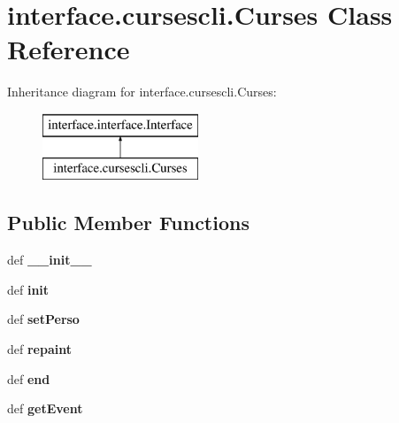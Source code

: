 \hypertarget{classinterface_1_1cursescli_1_1_curses}{\section{interface.\-cursescli.\-Curses \-Class \-Reference}
\label{classinterface_1_1cursescli_1_1_curses}
}
\-Inheritance diagram for interface.\-cursescli.\-Curses\-:\begin{figure}[H]
\begin{center}
\leavevmode
\includegraphics[height=2.000000cm]{classinterface_1_1cursescli_1_1_curses}
\end{center}
\end{figure}
\subsection*{\-Public \-Member \-Functions}
\begin{DoxyCompactItemize}
\item 
\hypertarget{classinterface_1_1cursescli_1_1_curses_a192eb6300c83226e1b98e4d7a5bc9561}{def {\bfseries \-\_\-\-\_\-init\-\_\-\-\_\-}}\label{classinterface_1_1cursescli_1_1_curses_a192eb6300c83226e1b98e4d7a5bc9561}

\item 
\hypertarget{classinterface_1_1cursescli_1_1_curses_a6ab69ed1b7afdc9d1d0f7e74ed6623cd}{def {\bfseries init}}\label{classinterface_1_1cursescli_1_1_curses_a6ab69ed1b7afdc9d1d0f7e74ed6623cd}

\item 
\hypertarget{classinterface_1_1cursescli_1_1_curses_a003586d92839ef7c13b164829e5ea5a4}{def {\bfseries set\-Perso}}\label{classinterface_1_1cursescli_1_1_curses_a003586d92839ef7c13b164829e5ea5a4}

\item 
\hypertarget{classinterface_1_1cursescli_1_1_curses_a03c24991bdaf625425fcdc00a31dd880}{def {\bfseries repaint}}\label{classinterface_1_1cursescli_1_1_curses_a03c24991bdaf625425fcdc00a31dd880}

\item 
\hypertarget{classinterface_1_1cursescli_1_1_curses_ae94215f68f2e77264bcd8b2338cd9bd6}{def {\bfseries end}}\label{classinterface_1_1cursescli_1_1_curses_ae94215f68f2e77264bcd8b2338cd9bd6}

\item 
\hypertarget{classinterface_1_1cursescli_1_1_curses_a80b940406bbf923b5deff0fe6c35f4d4}{def {\bfseries get\-Event}}\label{classinterface_1_1cursescli_1_1_curses_a80b940406bbf923b5deff0fe6c35f4d4}

\end{DoxyCompactItemize}
